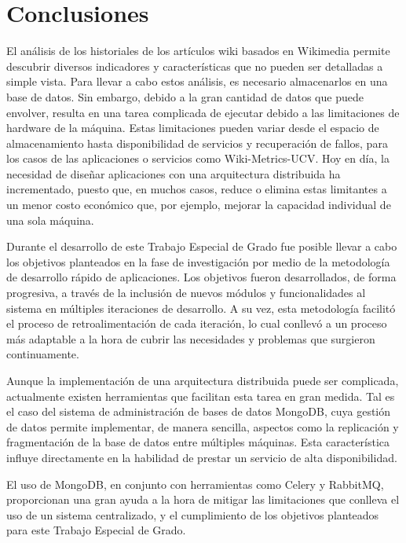 \section{Conclusiones}

El análisis de los historiales de los artículos wiki basados en Wikimedia permite
descubrir diversos indicadores y características que no pueden ser detalladas a simple
vista.
Para llevar a cabo estos análisis, es necesario almacenarlos en una base
de datos. Sin embargo, debido a la gran cantidad de datos que puede envolver, resulta
en una tarea complicada de ejecutar debido a las limitaciones de hardware de la
máquina.
Estas limitaciones pueden variar desde el espacio de almacenamiento hasta disponibilidad
de servicios y recuperación de fallos, para los casos de las aplicaciones o servicios como
Wiki-Metrics-UCV.
Hoy en día, la necesidad de diseñar aplicaciones con una arquitectura distribuida
ha incrementado, puesto que, en muchos casos, reduce o elimina estas limitantes
a un menor costo económico que, por ejemplo, mejorar la capacidad individual de una sola máquina.

Durante el desarrollo de este Trabajo Especial de Grado
fue posible llevar a cabo los objetivos planteados en la fase de investigación por medio
de la metodología de desarrollo rápido de aplicaciones.
Los objetivos fueron desarrollados, de forma progresiva, a través de la inclusión de nuevos módulos y funcionalidades al sistema en múltiples iteraciones de desarrollo.
A su vez, esta metodología facilitó el proceso de retroalimentación de cada iteración,
lo cual conllevó a un proceso más adaptable a la hora de cubrir las necesidades y problemas que surgieron continuamente.

Aunque la implementación de una arquitectura distribuida puede ser complicada,
actualmente existen herramientas que facilitan esta tarea en gran medida.
Tal es el caso del sistema de administración de bases de datos MongoDB, cuya gestión
de datos permite implementar, de manera sencilla, aspectos como la replicación y fragmentación de la base de datos entre múltiples máquinas.
Esta característica influye directamente en la habilidad de prestar un servicio de alta disponibilidad.

El uso de MongoDB, en conjunto con herramientas como Celery y RabbitMQ, proporcionan
una gran ayuda a la hora de mitigar las limitaciones que conlleva el uso de un sistema centralizado, y el cumplimiento de los objetivos planteados para este Trabajo Especial de Grado.

